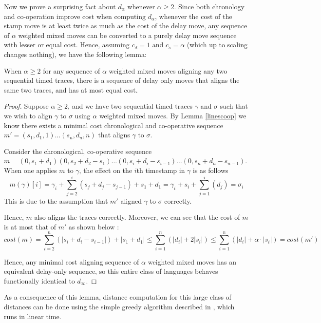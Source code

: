 \documentclass[runningheads]{llncs}
\begin{document}
Now we prove a surprising fact about $d_{\alpha}$ whenever $ \alpha \geq 2$. 
Since both chronology and co-operation improve cost when computing $d_{\alpha}$, whenever the cost of the stamp move is at least twice as much as the cost of the delay move, any sequence of $\alpha$ weighted mixed moves can be converted to a purely delay move sequence with lesser or equal cost. 
Hence, assuming $c_d = 1$ and $c_s = \alpha$ (which up to scaling changes nothing), we have the following lemma: 

\begin{lemma}\label{doubleisdelay} When $\alpha \geq 2$ for any sequence of $\alpha$ weighted mixed moves aligning any two sequential timed traces, there is a sequence of delay only moves that aligns the same two traces, and has at most equal cost. 
    
\end{lemma}


\begin{proof}
	Suppose $\alpha \geq 2$, and we have two sequential timed traces $\gamma$ and $\sigma$ such that we wish to align $\gamma$ to $\sigma$ using $\alpha$ weighted mixed moves. 
	By Lemma \ref{linescoop} we know there exists a minimal cost chronological and co-operative sequence $m' = (s_1, d_1, 1) \dots (s_n, d_n, n)$ that aligns $\gamma$ to $\sigma$. 

	Consider the chronological, co-operative sequence $m = (0, s_1 + d_1)(0, s_2 + d_2 - s_1)\dots(0, s_i + d_i - s_{i-1})\dots (0, s_n + d_n - s_{n-1})$. 
	When one applies $m$ to $\gamma$, the effect on the $i$th timestamp in $\gamma$ is as follows $$m(\gamma)[i] = \gamma_i + \sum_{j = 2}^{i} (s_j + d_j - s_{j-1}) + s_1 + d_1 = \gamma_i + s_i + \sum_{j = 1}^{i} (d_j) = \sigma_i$$
This is due to the assumption that $m'$ aligned $\gamma$ to $\sigma$ correctly.

Hence, $m$ also aligns the traces correctly. Moreover, we can see that the cost of $m$ is at most that of $m'$ as shown below : 
$$cost(m) = \sum_{i=2}^{n} (|s_i + d_i - s_{i-1}|) + |s_1 + d_1| \leq \sum_{i=1}^{n} (|d_i| + 2|s_i|) \leq \sum_{i=1}^{n} (|d_i| + \alpha \cdot|s_i|) = cost(m')$$

Hence, any minimal cost aligning sequence of $\alpha$ weighted mixed moves has an equivalent delay-only sequence, so this entire class of languages behaves functionally identical to $d_{\infty}$. 
\end{proof}


As a consequence of this lemma, distance computation for this large class of distances can be done using the simple greedy algorithm described in \cite{CR22}, which runs in linear time. 
\color{black}
\end{document}
